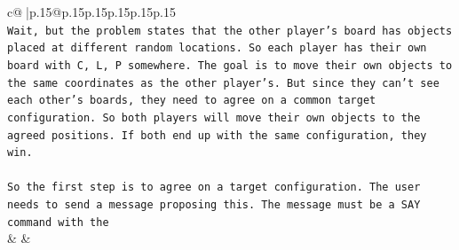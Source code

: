 \documentclass{article}
\begin{document}
{\begin{supertabular}{c@{$\;$}|p{.15\linewidth}@{}p{.15\linewidth}p{.15\linewidth}p{.15\linewidth}p{.15\linewidth}p{.15\linewidth}}
{{{\\ 
\texttt{Wait, but the problem states that the other player's board has objects placed at different random locations. So each player has their own board with C, L, P somewhere. The goal is to move their own objects to the same coordinates as the other player's. But since they can't see each other's boards, they need to agree on a common target configuration. So both players will move their own objects to the agreed positions. If both end up with the same configuration, they win.} \\
\\ 
\texttt{So the first step is to agree on a target configuration. The user needs to send a message proposing this. The message must be a SAY command with the} \\
            }
        }
    }
    & & \\ \\


\end{supertabular}}
\end{document}
